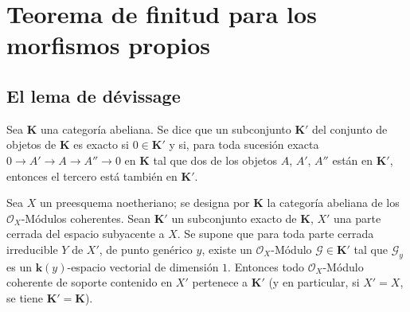 \section{Teorema de finitud para los morfismos propios}
\label{section:III.3}
\label{section:III.3-fr}

\subsection{El lema de d\'evissage}
\label{subsection:III.3.1}
\label{subsection:III.3.1-fr}

\begin{definition}[3.1.1]
\label{III.3.1.1-fr}
Sea $\boldsymbol{K}$ una categoría abeliana. Se dice que un subconjunto $\boldsymbol{K}'$ del
conjunto de objetos de $\boldsymbol{K}$ es exacto si $0\in\boldsymbol{K}'$ y si, para toda
sucesión exacta
$0\to A'\to A\to A''\to0$
en $\boldsymbol{K}$ tal que dos de los objetos $A$, $A'$, $A''$ están en $\boldsymbol{K}'$, entonces el
tercero está también en $\boldsymbol{K}'$.
\end{definition}

\begin{theorem}[3.1.2]
\label{III.3.1.2-fr}
Sea $X$ un preesquema noetheriano; se designa por $\boldsymbol{K}$ la categoría abeliana
de los $\mathcal O_X$-Módulos coherentes. Sean $\boldsymbol{K}'$ un subconjunto exacto de
$\boldsymbol{K}$, $X'$ una parte cerrada del espacio subyacente a $X$. Se supone que
para toda parte cerrada irreducible $Y$ de $X'$, de punto genérico $y$,
existe un $\mathcal O_X$-Módulo $\mathcal G\in\boldsymbol{K}'$ tal que $\mathcal G_y$ es
un $\boldsymbol{k}(y)$-espacio vectorial de dimensión $1$. Entonces todo $\mathcal O_X$-Módulo
coherente de soporte contenido en $X'$ pertenece a $\boldsymbol{K}'$ (y en particular,
si $X'=X$, se tiene $\boldsymbol{K}'=\boldsymbol{K}$).
\end{theorem}

